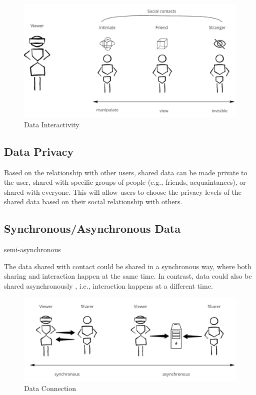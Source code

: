 \begin{figure}[h]
    \centering
    \includegraphics[width=0.8\linewidth]{images/Continuum-interaction.jpg}
    \caption{Data Interactivity}
    \label{fig:continuum:data-interaction}
\end{figure}

\subsection{Data Privacy}
Based on the relationship with other users, shared data can be made private to the user, shared with specific groups of people (e.g., friends, acquaintances), or shared with everyone. This will allow users to choose the privacy levels of the shared data based on their social relationship with others. 

\subsection{Synchronous/Asynchronous Data}

semi-asynchronous

The data shared with contact could be shared in a synchronous way, where both sharing and interaction happen at the same time. In contrast, data could also be shared asynchronously \cite{Smith2016}, i.e., interaction happens at a different time. 

\begin{figure}[h]
    \centering
    \includegraphics[width=0.8\linewidth]{images/continuum-connection.jpg}
    \caption{Data Connection}
    \label{fig:continuum:data-connection}
\end{figure}

